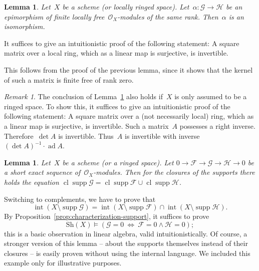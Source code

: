 \documentclass[10pt,reqno,a4paper]{amsbook}
\makeatletter
\theoremstyle{definition}
\theoremstyle{plain}
\newtheorem{lemma}[defn]{Lemma}
\theoremstyle{remark}
\newtheorem{rem}[defn]{Remark}
\newcommand{\F}{\mathcal{F}}
\renewcommand{\G}{\mathcal{G}}
\renewcommand{\H}{\mathcal{H}}
\renewcommand{\O}{\mathcal{O}}
\newcommand{\Sh}{\mathrm{Sh}}
\DeclareMathOperator{\Int}{int}
\DeclareMathOperator{\Clos}{cl}
\DeclareMathOperator{\supp}{supp}
\newcommand{\?}{\,{:}\,}
\renewcommand{\_}{\mathpunct{.}\,}
\renewenvironment{proof}[1][\proofname]{\par
  \pushQED{\qed}%
  \normalfont \topsep6\p@\@plus6\p@\relax
  \trivlist
  \item[\hskip\labelsep
        \itshape
    #1\@addpunct{.}]\ignorespaces
}{%
  \popQED\endtrivlist\@endpefalse
}
\makeatother
\begin{document}
\begin{lemma}\label{lemma:epi-iso}Let~$X$ be a scheme (or locally ringed space). Let~$\alpha : \G
\to \H$ be an epimorphism of finite locally free~$\O_X$-modules of the same
rank. Then~$\alpha$ is an isomorphism.\end{lemma}
\begin{proof}It suffices to give an intuitionistic proof of the following
statement: A square matrix over a local ring, which as a linear map is
surjective, is invertible.

This follows from the proof of the previous lemma, since it shows that the
kernel of such a matrix is finite free of rank zero.
\end{proof}

\begin{rem}The conclusion of Lemma~\ref{lemma:epi-iso} also holds if~$X$ is
only assumed to be a ringed space. To show this, it suffices to give an
intuitionistic proof of the following statement: A square matrix over a (not
necessarily local) ring, which as a linear map is surjective, is invertible.
Such a matrix~$A$ possesses a right inverse. Therefore~$\det A$ is invertible.
Thus~$A$ is invertible with inverse~$(\det A)^{-1} \cdot \operatorname{ad} A$.
\end{rem}

\begin{lemma}Let~$X$ be a scheme (or a ringed space). Let
$0 \to \F \to \G \to \H \to 0$ be a short exact sequence of~$\O_X$-modules.
Then for the closures of the supports there holds the equation
$\Clos \supp \G = \Clos \supp \F \cup \Clos \supp \H$.
\end{lemma}
\begin{proof}Switching to complements, we have to prove that
\[ \Int(X \setminus \supp\G) = \Int(X \setminus \supp\F) \cap \Int(X \setminus
\supp\H). \]
By Proposition~\ref{prop:characterization-support}, it suffices to prove
\[ \Sh(X) \models (\G = 0\ \Longleftrightarrow\ \F = 0 \wedge \H = 0); \]
this is a basic observation in linear algebra, valid intuitionistically.
\end{proof}
Of course, a stronger version of this lemma -- about the supports themselves
instead of their closures -- is easily proven without using the internal
language. We included this example only for illustrative purposes.
\end{document}

